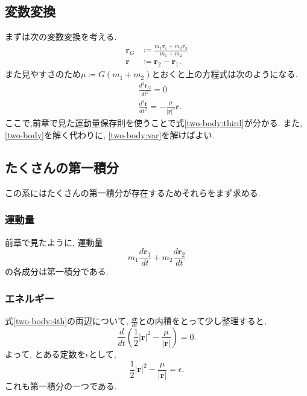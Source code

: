 \documentclass{ltjsarticle}
\theoremstyle{definition}
\numberwithin{thm}{section}
\theoremstyle{definition}
\numberwithin{prop}{section}
\theoremstyle{definition}
\numberwithin{dfn}{section}
\numberwithin{equation}{section}
\begin{document}
\subsection{変数変換}
まずは次の変数変換を考える.
\begin{subequations}
\begin{align}
    \bm{r}_G&\coloneq\frac{m_1\bm{r}_1+m_2\bm{r}_2}{m_1+m_2}\\
    \bm{r}&\coloneq\bm{r}_2-\bm{r}_1.
\end{align}
\end{subequations}
また見やすさのため$\mu\coloneq G(m_1+m_2)$とおくと上の方程式は次のようになる.
\begin{subequations} \label{two-body:var}
    \begin{align}
        &\frac{d^2\bm{r}_G}{dt^2}=0\label{two-body:third}\\
        &\frac{d^2\bm{r}}{dt^2}=-\frac{\mu}{|\bm{r}|^3}\bm{r}. \label{two-body:4th}
    \end{align}
\end{subequations}
ここで,前章で見た運動量保存則を使うことで式\ref{two-body:third}が分かる. また, \ref{two-body}を解く代わりに, \ref{two-body:var}を解けばよい.
\subsection{たくさんの第一積分}
この系にはたくさんの第一積分が存在するためそれらをまず求める.
\subsubsection{運動量}
前章で見たように, 運動量
\begin{equation} \label{two-body:momentum}
    m_1\frac{d\bm{r}_1}{dt}+m_2\frac{d\bm{r}_2}{dt}
\end{equation}
の各成分は第一積分である.
\subsubsection{エネルギー}
式\ref{two-body:4th}の両辺について, $\frac{d\bm{r}}{dt}$との内積をとって少し整理すると,
\begin{equation*}
    \frac{d}{dt}\left(\frac{1}{2}|\bm{r}|^2-\frac{\mu}{|\bm{r}|}\right)=0.
\end{equation*}
よって, とある定数を$\epsilon$として,
\begin{equation} \label{two-body:energy}
    \frac{1}{2}|\bm{r}|^2-\frac{\mu}{|\bm{r}|}=\epsilon.
\end{equation}
これも第一積分の一つである.
\end{document}
